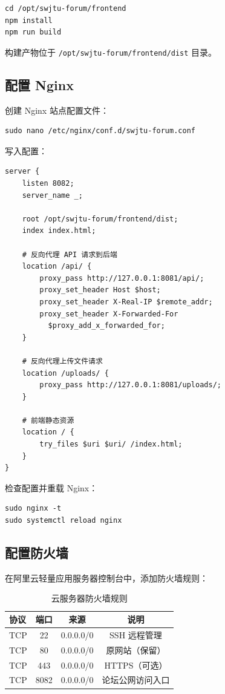 \documentclass[bwprint]{report}
\begin{document}
\begin{lstlisting}
cd /opt/swjtu-forum/frontend
npm install
npm run build
\end{lstlisting}

构建产物位于 \texttt{/opt/swjtu-forum/frontend/dist} 目录。

\subsection{配置 Nginx}

创建 Nginx 站点配置文件：

\begin{lstlisting}
sudo nano /etc/nginx/conf.d/swjtu-forum.conf
\end{lstlisting}

写入配置：

\begin{lstlisting}
server {
    listen 8082;
    server_name _;

    root /opt/swjtu-forum/frontend/dist;
    index index.html;

    # 反向代理 API 请求到后端
    location /api/ {
        proxy_pass http://127.0.0.1:8081/api/;
        proxy_set_header Host $host;
        proxy_set_header X-Real-IP $remote_addr;
        proxy_set_header X-Forwarded-For
          $proxy_add_x_forwarded_for;
    }

    # 反向代理上传文件请求
    location /uploads/ {
        proxy_pass http://127.0.0.1:8081/uploads/;
    }

    # 前端静态资源
    location / {
        try_files $uri $uri/ /index.html;
    }
}
\end{lstlisting}

检查配置并重载 Nginx：

\begin{lstlisting}
sudo nginx -t
sudo systemctl reload nginx
\end{lstlisting}

 
\subsection{配置防火墙}

在阿里云轻量应用服务器控制台中，添加防火墙规则：

\begin{table}[H]
    \caption{云服务器防火墙规则}
    \label{tab:firewall-rules}
    \centering
    \begin{tabular}{lccc}
        \toprule[1.5pt]
        协议 & 端口 & 来源 & 说明 \\
        \midrule[1pt]
        TCP & 22 & 0.0.0.0/0 & SSH 远程管理 \\
        TCP & 80 & 0.0.0.0/0 & 原网站（保留） \\
        TCP & 443 & 0.0.0.0/0 & HTTPS（可选） \\
        TCP & 8082 & 0.0.0.0/0 & 论坛公网访问入口 \\
        \bottomrule[1.5pt]
    \end{tabular}
\end{table}
\end{document}
